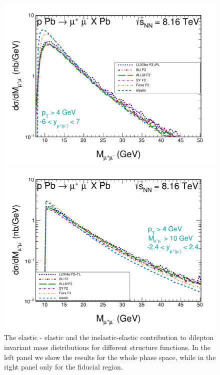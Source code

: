 \begin{figure}[!h]
\begin{minipage}{0.47\textwidth}
 \centerline{\includegraphics[width=1.0\textwidth]{figures_Marta/Mll.pdf}}
\end{minipage}
\begin{minipage}{0.47\textwidth}
 \centerline{\includegraphics[width=1.0\textwidth]{figures_Marta/Mll-c.pdf}}
\end{minipage}
\caption{The elastic - elastic and the inelastic-elastic contribution 
to dilepton invariant mass distributions 
for different structure functions. In the left panel we show the results for the whole phase space, while in the right panel only for the fiducial region.
}
 \label{fig:dsig_dMWW_ineine}
\end{figure}

